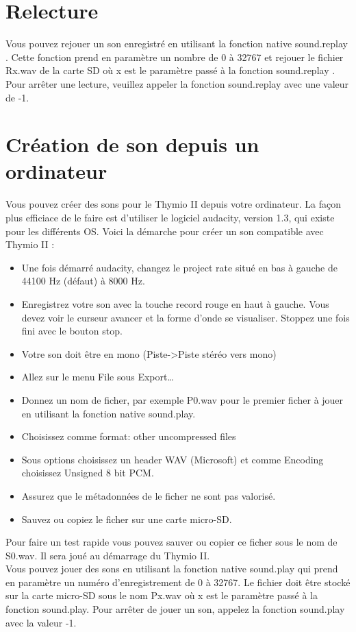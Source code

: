 \documentclass[a4paper, 12pt]{report}
\begin{document}
\section{Relecture}
Vous pouvez rejouer un son enregistré en utilisant la fonction native sound.replay . Cette fonction prend en paramètre un nombre de 0 à 32767 et rejouer le fichier Rx.wav de la carte SD où x est le paramètre passé à la fonction sound.replay . Pour arrêter une lecture, veuillez appeler la fonction sound.replay avec une valeur de -1.
\section{Création de son depuis un ordinateur}
Vous pouvez créer des sons pour le Thymio II depuis votre ordinateur. La façon plus efficiace de le faire est d'utiliser le logiciel audacity, version 1.3, qui existe pour les différents OS. Voici la démarche pour créer un son compatible avec Thymio II :\\
\begin{itemize}
\item Une fois démarré audacity, changez le project rate situé en bas à gauche de 44100 Hz (défaut) à 8000 Hz.
\item Enregistrez votre son avec la touche record rouge en haut à gauche. Vous devez voir le curseur avancer et la forme d'onde se visualiser. Stoppez une fois fini avec le bouton stop.
\item Votre son doit être en mono (Piste->Piste stéréo vers mono)
\item Allez sur le menu File sous Export…
\item Donnez un nom de ficher, par exemple P0.wav pour le premier ficher à jouer en utilisant la fonction native sound.play.
\item Choisissez comme format: other uncompressed files
\item Sous options choisissez un header WAV (Microsoft) et comme Encoding choisissez Unsigned 8 bit PCM.
\item Assurez que le métadonnées de le ficher ne sont pas valorisé.
\item Sauvez ou copiez le ficher sur une carte micro-SD.
\end{itemize}
Pour faire un test rapide vous pouvez sauver ou copier ce ficher sous le nom de S0.wav. Il sera joué au démarrage du Thymio II.\\
Vous pouvez jouer des sons en utilisant la fonction native sound.play qui prend en paramètre un numéro d'enregistrement de 0 à 32767. Le fichier doit être stocké sur la carte micro-SD sous le nom Px.wav où x est le paramètre passé à la fonction sound.play. Pour arrêter de jouer un son, appelez la fonction sound.play avec la valeur -1.
\end{document}
